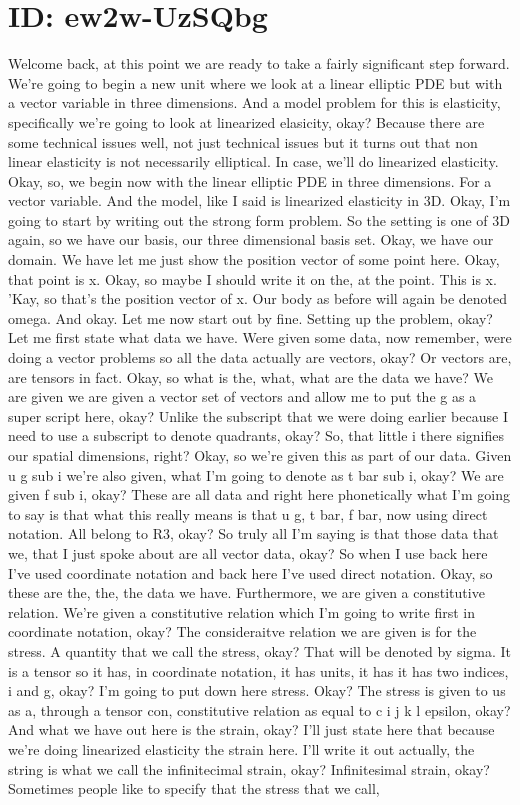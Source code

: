 \documentclass[10pt]{article}
\begin{document}
\section*{ID: ew2w-UzSQbg}
Welcome back, at this point we are ready to take a fairly significant step forward. We're going to begin a new unit where we look at a linear elliptic PDE but with a vector variable in three dimensions. And a model problem for this is elasticity, specifically we're going to look at linearized elasicity, okay? Because there are some technical issues well, not just technical issues but it turns out that non linear elasticity is not necessarily elliptical. In case, we'll do linearized elasticity. Okay, so, we begin now with the linear elliptic PDE in three dimensions. For a vector variable. And the model, like I said is linearized elasticity in 3D. Okay, I'm going to start by writing out the strong form problem. So the setting is one of 3D again, so we have our basis, our three dimensional basis set. Okay, we have our domain. We have let me just show the position vector of some point here. Okay, that point is x. Okay, so maybe I should write it on the, at the point. This is x. 'Kay, so that's the position vector of x. Our body as before will again be denoted omega. And okay. Let me now start out by fine. Setting up the problem, okay? Let me first state what data we have. Were given some data, now remember, were doing a vector problems so all the data actually are vectors, okay? Or vectors are, are tensors in fact. Okay, so what is the, what, what are the data we have? We are given we are given a vector set of vectors and allow me to put the g as a super script here, okay? Unlike the subscript that we were doing earlier because I need to use a subscript to denote quadrants, okay? So, that little i there signifies our spatial dimensions, right? Okay, so we're given this as part of our data. Given u g sub i we're also given, what I'm going to denote as t bar sub i, okay? We are given f sub i, okay? These are all data and right here phonetically what I'm going to say is that what this really means is that u g, t bar, f bar, now using direct notation. All belong to R3, okay? So truly all I'm saying is that those data that we, that I just spoke about are all vector data, okay? So when I use back here I've used coordinate notation and back here I've used direct notation. Okay, so these are the, the, the data we have. Furthermore, we are given a constitutive relation. We're given a constitutive relation which I'm going to write first in coordinate notation, okay? The consideraitve relation we are given is for the stress. A quantity that we call the stress, okay? That will be denoted by sigma. It is a tensor so it has, in coordinate notation, it has units, it has it has two indices, i and g, okay? I'm going to put down here stress. Okay? The stress is given to us as a, through a tensor con, constitutive relation as equal to c i j k l epsilon, okay? And what we have out here is the strain, okay? I'll just state here that because we're doing linearized elasticity the strain here. I'll write it out actually, the string is what we call the infinitecimal strain, okay? Infinitesimal strain, okay? Sometimes people like to specify that the stress that we call, 
\end{document}
